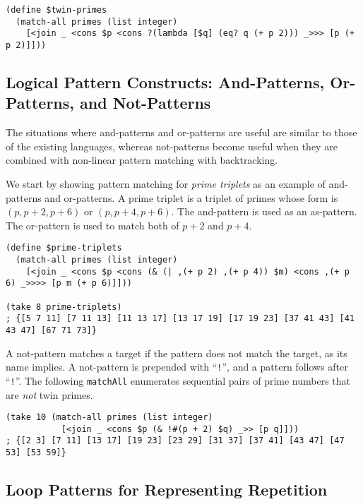\documentclass{article}
\begin{document}
\begin{lstlisting}[language=egison]
(define $twin-primes
  (match-all primes (list integer)
    [<join _ <cons $p <cons ?(lambda [$q] (eq? q (+ p 2))) _>>> [p (+ p 2)]]))
\end{lstlisting}

\subsection{Logical Pattern Constructs: And-Patterns, Or-Patterns, and Not-Patterns}\label{not-patterns}

The situations where and-patterns and or-patterns are useful are similar to those of the existing languages, whereas not-patterns become useful when they are combined with non-linear pattern matching with backtracking.

We start by showing pattern matching for \emph{prime triplets} as an example of and-patterns and or-patterns.
A prime triplet is a triplet of primes whose form is $(p,p+2,p+6)$ or $(p,p+4,p+6)$.
The and-pattern is used as an as-pattern.
The or-pattern is used to match both of $p+2$ and $p+4$.

\begin{lstlisting}[language=egison]
(define $prime-triplets
  (match-all primes (list integer)
    [<join _ <cons $p <cons (& (| ,(+ p 2) ,(+ p 4)) $m) <cons ,(+ p 6) _>>>> [p m (+ p 6)]]))

(take 8 prime-triplets)
; {[5 7 11] [7 11 13] [11 13 17] [13 17 19] [17 19 23] [37 41 43] [41 43 47] [67 71 73]}    
\end{lstlisting}


A not-pattern matches a target if the pattern does not match the target, as its name implies.
A not-pattern is prepended with ``\texttt{!}'', and a pattern follows after ``\texttt{!}''.
The following \texttt{matchAll} enumerates sequential pairs of prime numbers that are \emph{not} twin primes.

\begin{lstlisting}[language=egison]
(take 10 (match-all primes (list integer)
           [<join _ <cons $p (& !#(p + 2) $q) _>> [p q]]))
; {[2 3] [7 11] [13 17] [19 23] [23 29] [31 37] [37 41] [43 47] [47 53] [53 59]}
\end{lstlisting}

\subsection{Loop Patterns for Representing Repetition}
\end{document}
